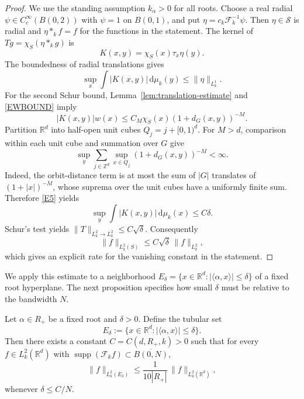\documentclass[12pt]{article}
\DeclareMathOperator{\supp}{supp}
\begin{document}
\begin{proof}
We use the standing assumption $k_\alpha>0$ for all roots. Choose a real radial $\psi\in C_c^\infty(B(0,2))$ with $\psi=1$ on $B(0,1)$, and put $\eta=c_k\mathcal{F}_k^{-1}\psi$. Then $\eta\in\mathcal{S}$ is radial and $\eta*_kf=f$ for the functions in the statement. The kernel of $Tg=\chi_S(\eta*_kg)$ is
\[
K(x,y)=\chi_S(x)\tau_x\eta(y).
\]
The boundedness of radial translations gives
\[
\sup_x\int|K(x,y)|\,\mathrm{d}\mu_k(y)\le\|\eta\|_{L_k^1}.
\]
For the second Schur bound, Lemma~\ref{lem:translation-estimate} and \eqref{EWBOUND} imply
\begin{equation}\label{E4}
|K(x,y)|w(x)\le C_M\chi_S(x)(1+d_G(x,y))^{-M}.
\end{equation}
Partition $\mathbb{R}^d$ into half-open unit cubes $Q_j=j+[0,1)^d$. For $M>d$, comparison within each unit cube and summation over $G$ give
\[
\sup_y\sum_{j\in\mathbb{Z}^d}\sup_{x\in Q_j}(1+d_G(x,y))^{-M}<\infty.
\]
Indeed, the orbit-distance term is at most the sum of $|G|$ translates of $(1+|x|)^{-M}$, whose suprema over the unit cubes have a uniformly finite sum. Therefore \eqref{E5} yields
\[
\sup_y\int|K(x,y)|\,\mathrm{d}\mu_k(x)\le C\delta.
\]
Schur's test yields $\|T\|_{L_k^2\to L_k^2}\le C\sqrt\delta$. Consequently
\[
\|f\|_{L_k^2(S)}\le C\sqrt\delta\,\|f\|_{L_k^2},
\]
which gives an explicit rate for the vanishing constant in the statement.
\end{proof}
\begin{remark}
We apply this estimate to a neighborhood $E_\delta=\{x\in\mathbb{R}^d:|\langle\alpha,x\rangle|\le\delta\}$ of a fixed root hyperplane. The next proposition specifies how small $\delta$ must be relative to the bandwidth $N$.
\end{remark}

\begin{proposition}
\label{prop:hyperplane-mass}
Let $\alpha \in R_+$ be a fixed root and $\delta>0$. Define the tubular set
\[
E_\delta := \bigl\{ x \in \mathbb{R}^d : |\langle \alpha, x \rangle| \le \delta \bigr\}.
\]
Then there exists a constant $C = C(d, R_+, k) > 0$ such that for every $f \in L_k^2(\mathbb{R}^d)$ with $\supp(\mathcal{F}_k f) \subset \overline{B(0,N)}$,
\begin{equation}\label{E8}
\| f \|_{L_k^2(E_\delta)} \le \frac{1}{10|R_+|} \, \| f \|_{L_k^2(\mathbb{R}^d)},
\end{equation}
whenever $\delta \le C/N$.
\end{proposition}
\end{document}
